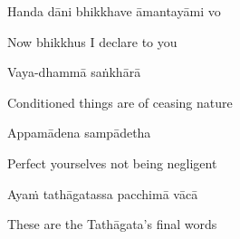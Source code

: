 Handa dāni bhikkhave āmantayāmi vo

\begin{english}
  Now bhikkhus I declare to you
\end{english}

Vaya-dhammā saṅkhārā

\begin{english}
  Conditioned things are of ceasing nature\makeatletter\hyperlink{endnote94-appendix}\makeatother
\end{english}

Appamādena sampādetha

\begin{english}
  Perfect yourselves not being negligent
\end{english}

Ayaṁ tathāgatassa pacchimā vācā

\begin{english}
  These are the Tathāgata's final words
\end{english}

\suttaRef{[DN 16]}

\enlargethispage{\baselineskip\vspace{-1.0em}}
